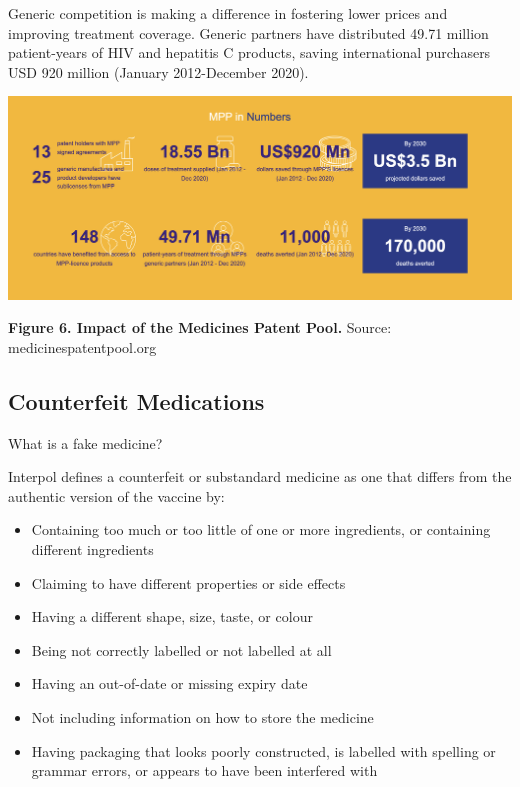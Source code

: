 \documentclass[
  11pt,
  paper=a4,
  ,captions=tableheading
]{scrartcl}
\begin{document}
Generic competition is making a difference in fostering lower prices and
improving treatment coverage. Generic partners have distributed 49.71
million patient-years of HIV and hepatitis C products, saving
international purchasers USD 920 million (January 2012-December 2020).

\includegraphics[width=6.25in,height=\textheight]{images/MMP_outcomes.png}

\textbf{Figure 6. Impact of the Medicines Patent Pool.} Source:
medicinespatentpool.org

\hypertarget{counterfeit-medications}{%
\subsection*{Counterfeit Medications}\label{counterfeit-medications}}

What is a fake medicine?

Interpol defines a counterfeit or substandard medicine as one that
differs from the authentic version of the vaccine by:

\begin{itemize}
\item
  Containing too much or too little of one or more ingredients, or
  containing different ingredients
\item
  Claiming to have different properties or side effects
\item
  Having a different shape, size, taste, or colour
\item
  Being not correctly labelled or not labelled at all
\item
  Having an out-of-date or missing expiry date
\item
  Not including information on how to store the medicine
\item
  Having packaging that looks poorly constructed, is labelled with
  spelling or grammar errors, or appears to have been interfered with
\end{itemize}
\end{document}
